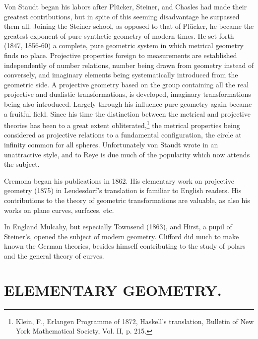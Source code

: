 \documentclass[oneside]{book}
\begin{document}
{Von Staudt began his labors after Pl\"ucker, Steiner, and Chasles had
made their greatest contributions, but in spite of this seeming
disadvantage he surpassed them all. Joining the Steiner school, as
opposed to that of Pl\"ucker, he became the greatest exponent of pure
synthetic geometry of modern times. He set forth (1847, 1856-60) a
complete, pure geometric system in which metrical geometry finds no
place. Projective properties foreign to measurements are
established independently of number relations, number being drawn
from geometry instead of conversely, and imaginary elements being
systematically introduced from the geometric side. A projective
geometry based on the group containing all the real projective and
dualistic transformations, is developed, imaginary transformations
being also introduced. Largely through his influence pure geometry
again became a fruitful field. Since his time the distinction
between the metrical and projective theories has been to a great
extent obliterated,\footnote{Klein, F., Erlangen Programme of
1872, Haskell's translation, Bulletin of New York Mathematical
Society, Vol. II, p. 215.} the metrical properties being considered
as projective relations to a fundamental configuration, the circle
at infinity common for all spheres. Unfortunately von Staudt wrote
in an unattractive style, and to Reye is due much of the popularity
which now attends the subject.

Cremona began his publications in 1862. His elementary work on
projective geometry (1875) in Leudesdorf's translation is familiar
to English readers. His contributions to the theory of geometric
transformations are valuable, as also his works on plane curves,
surfaces, etc.

In England Mulcahy, but especially Townsend (1863), and Hirst, a
pupil of Steiner's, opened the subject of modern geometry. Clifford
did much to make known the German theories, besides himself
contributing to the study of polars and the general theory of curves.

\chapter{ELEMENTARY GEOMETRY.}

}
\end{document}
